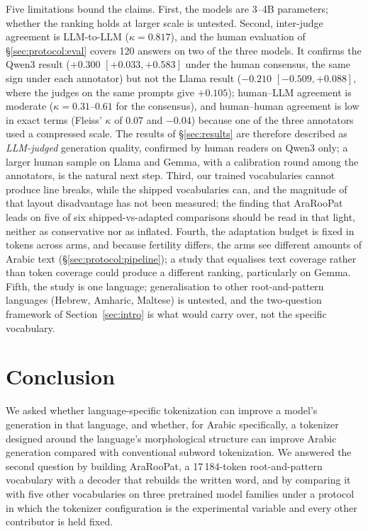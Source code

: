 \documentclass[a4paper,fleqn]{cas-sc}
\begin{document}
Five limitations bound the claims. First, the models are 3--4B parameters; whether the ranking holds at larger scale is untested. Second, inter-judge agreement is LLM-to-LLM ($\kappa = 0.817$), and the human evaluation of \S\ref{sec:protocol:eval} covers 120 answers on two of the three models. It confirms the Qwen3 result ($+0.300$ $[+0.033,+0.583]$ under the human consensus, the same sign under each annotator) but not the Llama result ($-0.210$ $[-0.509,+0.088]$, where the judges on the same prompts give $+0.105$); human--LLM agreement is moderate ($\kappa = 0.31$--$0.61$ for the consensus), and human--human agreement is low in exact terms (Fleiss' $\kappa$ of $0.07$ and $-0.04$) because one of the three annotators used a compressed scale. The results of \S\ref{sec:results} are therefore described as \emph{LLM-judged} generation quality, confirmed by human readers on Qwen3 only; a larger human sample on Llama and Gemma, with a calibration round among the annotators, is the natural next step.
Third, our trained vocabularies cannot produce line breaks, while the shipped vocabularies can, and the magnitude of that layout disadvantage has not been measured; the finding that AraRooPat leads on five of six shipped-vs-adapted comparisons should be read in that light, neither as conservative nor as inflated. Fourth, the adaptation budget is fixed in tokens across arms, and because fertility differs, the arms see different amounts of Arabic text (\S\ref{sec:protocol:pipeline}); a study that equalises text coverage rather than token coverage could produce a different ranking, particularly on Gemma. Fifth, the study is one language; generalisation to other root-and-pattern languages (Hebrew, Amharic, Maltese) is untested, and the two-question framework of Section~\ref{sec:intro} is what would carry over, not the specific vocabulary.

\section{Conclusion}
\label{sec:conclusion}

We asked whether language-specific tokenization can improve a model's generation in that language, and whether, for Arabic specifically, a tokenizer designed around the language's morphological structure can improve Arabic generation compared with conventional subword tokenization. We answered the second question by building AraRooPat, a 17\,184-token root-and-pattern vocabulary with a decoder that rebuilds the written word, and by comparing it with five other vocabularies on three pretrained model families under a protocol in which the tokenizer configuration is the experimental variable and every other contributor is held fixed.
\end{document}
